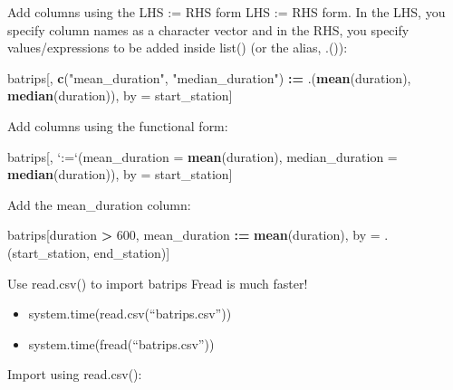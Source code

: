 \documentclass[]{book}
\newenvironment{Shaded}{\begin{snugshade}}{\end{snugshade}}
\newcommand{\DataTypeTok}[1]{\textcolor[rgb]{0.13,0.29,0.53}{#1}}
\newcommand{\DecValTok}[1]{\textcolor[rgb]{0.00,0.00,0.81}{#1}}
\newcommand{\ErrorTok}[1]{\textcolor[rgb]{0.64,0.00,0.00}{\textbf{#1}}}
\newcommand{\KeywordTok}[1]{\textcolor[rgb]{0.13,0.29,0.53}{\textbf{#1}}}
\newcommand{\NormalTok}[1]{#1}
\newcommand{\OperatorTok}[1]{\textcolor[rgb]{0.81,0.36,0.00}{\textbf{#1}}}
\newcommand{\StringTok}[1]{\textcolor[rgb]{0.31,0.60,0.02}{#1}}
\providecommand{\tightlist}{%
  \setlength{\itemsep}{0pt}\setlength{\parskip}{0pt}}
\begin{document}
Add columns using the LHS := RHS form
LHS := RHS form. In the LHS, you specify column names as a character vector and in the RHS, you specify values/expressions to be added inside list() (or the alias, .()):

\begin{Shaded}
\begin{Highlighting}[]
\NormalTok{batrips[, }\KeywordTok{c}\NormalTok{(}\StringTok{"mean_duration"}\NormalTok{, }
            \StringTok{"median_duration"}\NormalTok{) }\OperatorTok{:}\ErrorTok{=}\StringTok{ }\NormalTok{.(}\KeywordTok{mean}\NormalTok{(duration), }\KeywordTok{median}\NormalTok{(duration)), }
\NormalTok{        by =}\StringTok{ }\NormalTok{start_station]}
\end{Highlighting}
\end{Shaded}

Add columns using the functional form:

\begin{Shaded}
\begin{Highlighting}[]
\NormalTok{batrips[, }\StringTok{`}\DataTypeTok{:=}\StringTok{`}\NormalTok{(}\DataTypeTok{mean_duration =} \KeywordTok{mean}\NormalTok{(duration), }
               \DataTypeTok{median_duration =} \KeywordTok{median}\NormalTok{(duration)), }
\NormalTok{        by =}\StringTok{ }\NormalTok{start_station]}
\end{Highlighting}
\end{Shaded}

Add the mean\_duration column:

\begin{Shaded}
\begin{Highlighting}[]
\NormalTok{batrips[duration }\OperatorTok{>}\StringTok{ }\DecValTok{600}\NormalTok{, mean_duration }\OperatorTok{:}\ErrorTok{=}\StringTok{ }\KeywordTok{mean}\NormalTok{(duration), }
\NormalTok{        by =}\StringTok{ }\NormalTok{.(start_station, end_station)]}
\end{Highlighting}
\end{Shaded}

Use read.csv() to import batrips
Fread is much faster!

\begin{itemize}
\tightlist
\item
  system.time(read.csv(``batrips.csv''))
\item
  system.time(fread(``batrips.csv''))
\end{itemize}

Import using read.csv():
\end{document}
